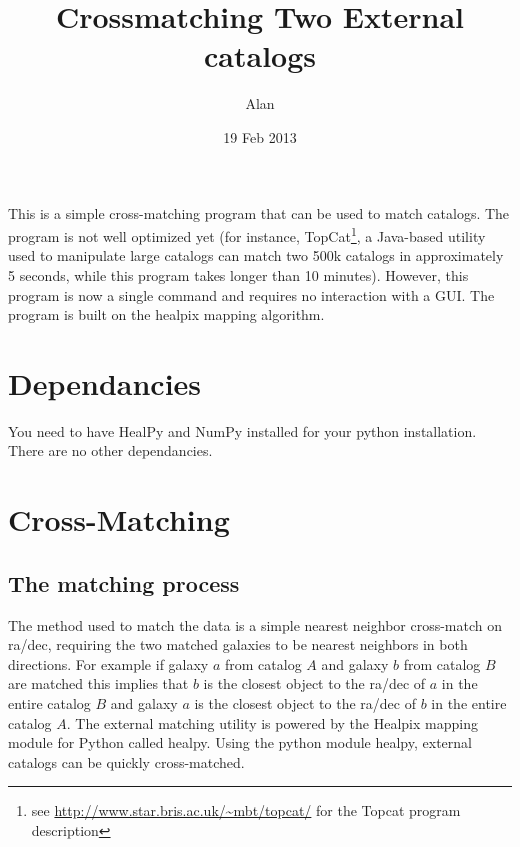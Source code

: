\documentclass[useAMS,usenatbib,usegraphicx]{article}
\title{Crossmatching Two External catalogs}
\author{Alan}
\date{19 Feb 2013}
\begin{document}
\maketitle

This is a simple cross-matching program that can be used to match catalogs. The program is not well optimized yet (for instance, TopCat\footnote{see \url{http://www.star.bris.ac.uk/~mbt/topcat/} for the Topcat program description}, a Java-based utility used to manipulate large catalogs can match two 500k catalogs in approximately 5 seconds, while this program takes longer than 10 minutes). However, this program is now a single command and requires no interaction with a GUI. The program is built on the healpix mapping algorithm. 

\section{Dependancies}
You need to have HealPy and NumPy installed for your python installation. There are no other dependancies.

\section*{Cross-Matching}\label{crossmatch_program}
\subsection*{The matching process}\label{matching}
The method used to match the data is a simple nearest neighbor cross-match on ra/dec, requiring the two matched galaxies 
to be nearest neighbors in both directions. For example if galaxy $a$ from catalog $A$ and galaxy $b$ from catalog $B$ are 
matched this implies that $b$ is the closest object to the ra/dec of $a$ in the entire catalog $B$ and galaxy $a$ is the 
closest object to the ra/dec of $b$ in the entire catalog $A$.  The external matching utility is powered by the Healpix mapping module
 for Python called healpy. Using the python module healpy, external catalogs can be quickly cross-matched. 
\end{document}
